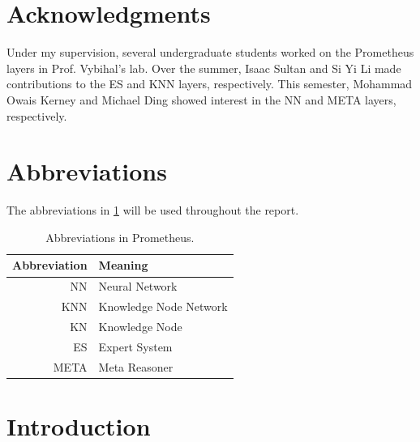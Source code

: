 \documentclass[titlepage,11pt]{article}
\begin{document}
\section*{Acknowledgments}
Under my supervision, several undergraduate students worked on the Prometheus layers in Prof. Vybihal's lab. Over the summer, Isaac Sultan and Si Yi Li made contributions to the ES and KNN layers, respectively. This semester, Mohammad Owais Kerney and Michael Ding showed interest in the NN and META layers, respectively.

\clearpage
\tableofcontents

\listoffigures
\listoftables
\clearpage

\twocolumn

\section*{Abbreviations}

The abbreviations in \cref{table:abbrevations} will be used throughout the report.

\begin{table}[!htb]
	\centering
	\caption{Abbreviations in Prometheus.}
	\begin{tabular}{r | l}
		\textbf{Abbreviation} & \textbf{Meaning} \\ \hline
		NN & Neural Network \\
		KNN & Knowledge Node Network \\
		KN & Knowledge Node \\
		ES & Expert System \\
		META & Meta Reasoner
	\end{tabular}
	\label{table:abbrevations}
\end{table}

\section{Introduction} \label{sec:intro}
\end{document}
